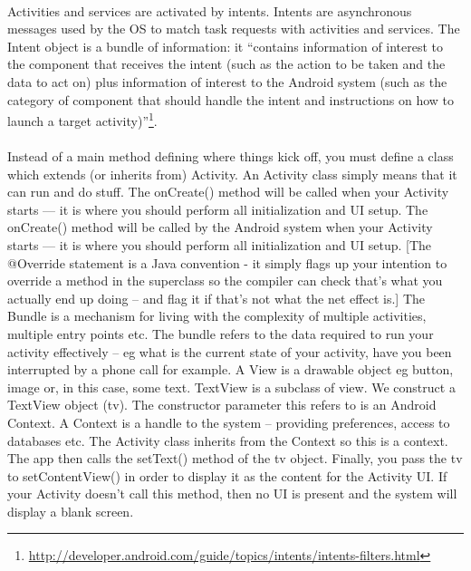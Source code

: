\documentclass[12pt, a4paper, twoside]{book}
\begin{document}
\paragraph{} Activities and services are activated by intents. Intents are asynchronous messages used by the OS to match task requests with activities and services. The Intent object is a bundle of information: it ``contains information of interest to the component that receives the intent (such as the action to be taken and the data to act on) plus information of interest to the Android system (such as the category of component that should handle the intent and instructions on how to launch a target activity)''\footnote{\url{http://developer.android.com/guide/topics/intents/intents-filters.html}}.


\paragraph{} Instead of a main method defining where things kick off, you must define a class which extends (or inherits from) Activity. An Activity class simply means that it can run and do stuff.
The onCreate() method will be called when your Activity starts — it is where you should perform all initialization and UI setup. The onCreate() method will be called by the Android system when your Activity starts — it is where you should perform all initialization and UI setup. [The @Override statement is a Java convention - it simply flags up your intention to override a method in the superclass so the compiler can check that’s what you actually end up doing – and flag it if that’s not what the net effect is.] The Bundle is a mechanism for living with the complexity of multiple activities, multiple entry points etc. The bundle refers to the data required to run your activity effectively – eg what is the current state of your activity, have you been interrupted by a phone call for example.
A View is a drawable object eg button, image or, in this case, some text. TextView is a subclass of view. We construct a TextView object (tv). The constructor parameter this refers to is an Android Context. A Context is a handle to the system – providing preferences, access to databases etc. The Activity class inherits from the Context so this is a context.  
The app then calls the setText() method of the tv object.
Finally, you pass the tv to setContentView() in order to display it as the content for the Activity UI. If your Activity doesn't call this method, then no UI is present and the system will display a blank screen.
\end{document}
